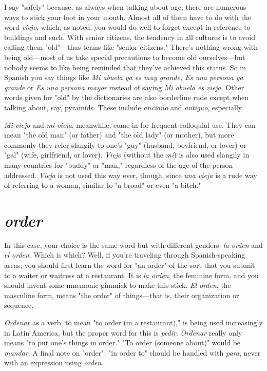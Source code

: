 I say "safely" because, as always when talking about age, there
are numerous ways to stick your foot in your mouth. Almost all of
them have to do with the word \emph{viejo}, which, as noted, you would do
well to forget except in reference to buildings and such. With senior
citizens, the tendency in all cultures is to avoid calling them "old"---thus terms like "senior citizens." There's nothing wrong with being
old---most of us take special precautions to become old ourselves---but
nobody seems to like being reminded that they've achieved this status.
So in Spanish you say things like \emph{Mi abuela ya es muy grande, Es
una persona ya grande} or  \emph{Es una persona mayor} instead of saying \emph{Mi
abuela es vieja}. Other words given for "old" by the dictionaries are
also borderline rude except when talking about, say, pyramids. These
include \emph{anciano} and \emph{antiguo}, especially.

\emph{Mi viejo} and \emph{mi vieja}, meanwhile, come in for frequent colloquial use. They can mean "the old man" (or father) and "the old lady"
(or mother), but more commonly they refer slangily to one's "guy"
(husband, boyfriend, or lover) or "gal" (wife, girlfriend, or lover). \emph{Viejo}
(without the \emph{mí}) is also used slangily in many countries for "buddy" or
"man," regardless of the age of the person addressed. \emph{Vieja} is not used
this way ever, though, since \emph{una vieja} is a rude way of referring to a
woman, similar to "a broad" or even "a bitch."

\section{\emph{order}}

In this case, your choice is the same word but with different
genders: \emph{la orden} and \emph{el orden}. Which is which? Well, if you're traveling through Spanish-speaking areas, you should first learn the word for
"an order" of the sort that you submit to a waiter or waitress at a restaurant. It is \emph{la orden}, the feminine form, and you should invent some
mnemonic gimmick to make this stick. \emph{El orden}, the masculine form,
means "the order" of things---that is, their organization or sequence.

\emph{Ordenar} as a verb, to mean "to order (in a restaurant)," is being used
increasingly in Latin America, but the proper word for this is \emph{pedir}.
\emph{Ordenar} really only means "to put one's things in order." "To order
(someone about)" would be \emph{mandar}. A final note on "order": "in order
to" should be handled with \emph{para}, never with an expression using
\emph{orden}.

